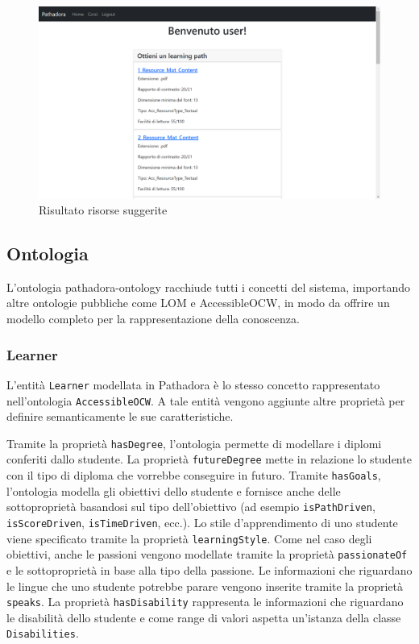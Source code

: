 \begin{figure}[H]
\centering
\includegraphics[scale=0.4]{res/path-result.png}
\caption{Risultato risorse suggerite}
\label{fig:resources-generation}
\end{figure}

\subsection{Ontologia}
L’ontologia pathadora-ontology racchiude tutti i concetti del sistema, importando altre ontologie pubbliche come LOM e AccessibleOCW, in modo da offrire un modello completo per la rappresentazione della conoscenza.

\subsubsection{Learner}
L'entità \texttt{Learner} modellata in Pathadora è lo stesso concetto rappresentato nell'ontologia \texttt{AccessibleOCW}. A tale entità vengono aggiunte altre proprietà per definire semanticamente le sue caratteristiche.

Tramite la proprietà \texttt{hasDegree}, l'ontologia permette di modellare i diplomi conferiti dallo studente. La proprietà \texttt{futureDegree} mette in relazione lo studente con il tipo di diploma che vorrebbe conseguire in futuro. Tramite \texttt{hasGoals}, l'ontologia modella gli obiettivi dello studente e fornisce anche delle sottoproprietà basandosi sul tipo dell'obiettivo (ad esempio \texttt{isPathDriven}, \texttt{isScoreDriven}, \texttt{isTimeDriven}, ecc.). Lo stile d'apprendimento di uno studente viene specificato tramite la proprietà \texttt{learningStyle}. Come nel caso degli obiettivi, anche le passioni vengono modellate tramite la proprietà \texttt{passionateOf} e le sottoproprietà in base alla tipo della passione. Le informazioni che riguardano le lingue che uno studente potrebbe parare vengono inserite tramite la proprietà \texttt{speaks}.
La proprietà \texttt{hasDisability} rappresenta le informazioni che riguardano le disabilità dello studente e come range di valori aspetta un'istanza della classe \texttt{Disabilities}.

